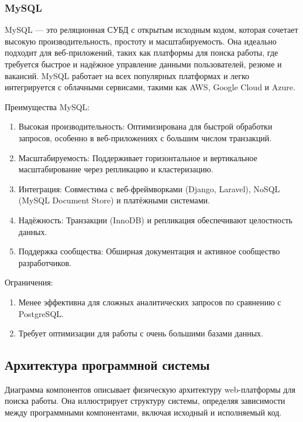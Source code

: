 \subsubsection{MySQL}

MySQL — это реляционная СУБД с открытым исходным кодом, которая сочетает высокую производительность, простоту и масштабируемость. Она идеально подходит для веб-приложений, таких как платформы для поиска работы, где требуется быстрое и надёжное управление данными пользователей, резюме и вакансий. MySQL работает на всех популярных платформах и легко интегрируется с облачными сервисами, такими как AWS, Google Cloud и Azure.

Преимущества MySQL:

\begin{enumerate}
	\item Высокая производительность: Оптимизирована для быстрой обработки запросов, особенно в веб-приложениях с большим числом транзакций.
	\item Масштабируемость: Поддерживает горизонтальное и вертикальное масштабирование через репликацию и кластеризацию.
	\item Интеграция: Совместима с веб-фреймворками (Django, Laravel), NoSQL (MySQL Document Store) и платёжными системами.
	\item Надёжность: Транзакции (InnoDB) и репликация обеспечивают целостность данных.
	\item Поддержка сообщества: Обширная документация и активное сообщество разработчиков.
\end{enumerate}

Ограничения:

\begin{enumerate}
	\item Менее эффективна для сложных аналитических запросов по сравнению с PostgreSQL.
	\item Требует оптимизации для работы с очень большими базами данных.
\end{enumerate}

\subsection{Архитектура программной системы}

Диаграмма компонентов описывает физическую архитектуру web-платформы для поиска работы. Она иллюстрирует структуру системы, определяя зависимости между программными компонентами, включая исходный и исполняемый код.

